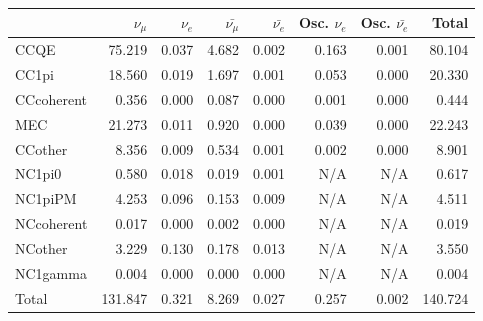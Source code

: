 
\begin{table}
\center
\begin{tabular} { | l ||r | r | r | r | r | r | | r | }
\hline
 
              & $\nu_\mu$            & $\nu_e$              & $\bar{\nu_\mu}$      & $\bar{\nu_e}$        & Osc. $\nu_e$         & Osc. $\bar{\nu_e}$   & Total                \\ \hline\hline
 CCQE         & 75.219               & 0.037                & 4.682                & 0.002                & 0.163                & 0.001                & 80.104               \\ \hline
 CC1pi        & 18.560               & 0.019                & 1.697                & 0.001                & 0.053                & 0.000                & 20.330               \\ \hline
 CCcoherent   & 0.356                & 0.000                & 0.087                & 0.000                & 0.001                & 0.000                & 0.444                \\ \hline
 MEC          & 21.273               & 0.011                & 0.920                & 0.000                & 0.039                & 0.000                & 22.243               \\ \hline
 CCother      & 8.356                & 0.009                & 0.534                & 0.001                & 0.002                & 0.000                & 8.901                \\ \hline
 NC1pi0       & 0.580                & 0.018                & 0.019                & 0.001                & N/A                  & N/A                  & 0.617                \\ \hline
 NC1piPM      & 4.253                & 0.096                & 0.153                & 0.009                & N/A                  & N/A                  & 4.511                \\ \hline
 NCcoherent   & 0.017                & 0.000                & 0.002                & 0.000                & N/A                  & N/A                  & 0.019                \\ \hline
 NCother      & 3.229                & 0.130                & 0.178                & 0.013                & N/A                  & N/A                  & 3.550                \\ \hline
 NC1gamma     & 0.004                & 0.000                & 0.000                & 0.000                & N/A                  & N/A                  & 0.004                \\ \hline
\hline
 Total        & 131.847              & 0.321                & 8.269                & 0.027                & 0.257                & 0.002                & 140.724              \\ \hline


\end{tabular}
\end{table}
